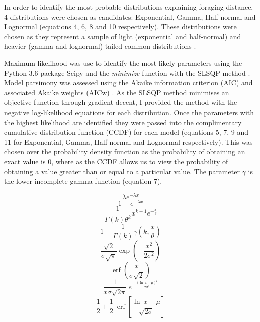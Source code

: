 \documentclass[11pt,usenames,dvipsnames,a4paper]{article}
\DeclareMathOperator\erf{erf}
\begin{document}
\begin{linenumbers}
\hspace{\parindent}
In order to identify the most probable distributions explaining foraging distance, 4 distributions were chosen as candidates: Exponential, Gamma, Half-normal and Lognormal (equations 4, 6, 8 and 10 respectively). These distributions were chosen as they represent a sample of light (exponential and half-normal) and heavier (gamma and lognormal) tailed common distributions \citep{Frank2009}.

Maximum likelihood was use to identify the most likely parameters using the Python 3.6 \citep{python} package Scipy and the \textit{minimize} \citep{Jones2001} function with the SLSQP method \citep{Kraft1988}. Model parsimony was assessed using the Akaike information criterion (AIC) and associated Akaike weights (AICw) \citep{Burnham2004}. As the SLSQP method minimises an objective function through gradient decent, I provided the method with the negative log-likelihood equations for each distribution. Once the parameters with the highest likelihood are identified they were passed into the complimentary cumulative distribution function (CCDF) for each model (equations 5, 7, 9 and 11 for Exponential, Gamma, Half-normal and Lognormal respectively). This was chosen over the probability density function as the probability of obtaining an exact value is 0, where as the CCDF allows us to view the probability of obtaining a value greater than or equal to a particular value. The parameter $\gamma$ is the lower incomplete gamma function (equation 7).
\end{linenumbers}

\begin{equation}
\lambda e^{-\lambda x}
\end{equation}
\begin{equation}
1 - e^{-\lambda x}
\end{equation}
\begin{equation}
\frac{1}{\Gamma(k)\theta^k}x^{k-1}e^{-\frac{x}{\theta}}
\end{equation}
\begin{equation}
1 - \frac{1}{\Gamma(k)}\gamma(k,\frac{x}{\theta})
\end{equation}
\begin{equation}
\frac{\sqrt{2}}{\sigma \sqrt{\pi}} \exp \left(-\frac{x^2}{2 \sigma^2}\right)
\end{equation}
\begin{equation}
\erf\left(\frac{x}{\sigma \sqrt{2}}\right)
\end{equation}
\begin{equation}
\frac{1}{x \sigma \sqrt{2 \pi}}\ e^{- \frac{(\ln\ x - \mu)^2}{2\sigma^2}}
\end{equation}
\begin{equation}
\frac{1}{2} + \frac{1}{2}\ \erf\left[\frac{\ln\ x - \mu}{\sqrt{2 \sigma}}\right]
\end{equation}
\end{document}
